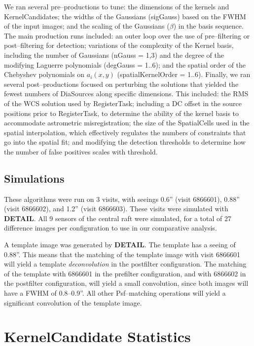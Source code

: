 \documentclass[prd, nofootinbib, floatfix, 11pt,tightenlines,times]{article}
\begin{document}
We ran several pre--productions to tune: the dimensions of the kernels
and KernelCandidates; the widths of the Gaussians (sigGauss) based on
the FWHM of the input images; and the scaling of the Gaussians
($\beta$) in the basis sequence.  The main production runs included:
an outer loop over the use of pre--filtering or post--filtering for
detection; variations of the complexity of the Kernel basis, including
the number of Gaussians (nGauss = 1,3) and the degree of the modifying
Laguerre polynomials (degGauss = 1..6); and the spatial order of the
Chebyshev polynomials on $a_i(x,y)$ (spatialKernelOrder = 1..6).
Finally, we ran several post--productions focused on perturbing the
solutions that yielded the fewest numbers of DiaSources along specific
dimensions.  This included: the RMS of the WCS solution used by
RegisterTask; including a DC offset in the source positions prior to
RegisterTask, to determine the ability of the kernel basis to
accommodate astrometric misregistration; the size of the SpatialCells
used in the spatial interpolation, which effectively regulates the
numbers of constraints that go into the spatial fit; and modifying the
detection thresholds to determine how the number of false positives
scales with threshold.

\subsection{Simulations}

These algorithms were run on 3 visits, with seeings 0.6'' (visit
6866601), 0.88'' (visit 6866602), and 1.2'' (visit 6866603).  These
visits were simulated with {\bf DETAIL}.  All 9 sensors of the central
raft were simulated, for a total of 27 difference images per
configuration to use in our comparative analysis.

A template image was generated by {\bf DETAIL}.  The template has a
seeing of 0.88''.  This means that the matching of the template image
with visit 6866601 will yield a template {\it deconvolution} in the
postfilter configuration.  The matching of the template with 6866601
in the prefilter configuration, and with 6866602 in the postfilter
configuration, will yield a small convolution, since both images will
have a FWHM of 0.8--0.9''.  All other Psf--matching operations will
yield a significant convolution of the template image.

\section{KernelCandidate Statistics}
\end{document}
